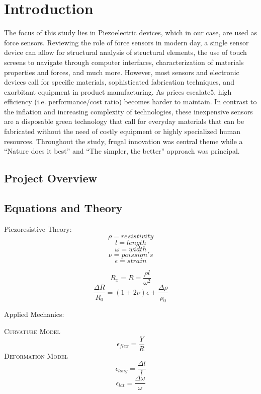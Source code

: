 \documentclass[12pt]{article}
\begin{document}
\pagebreak
\section{Introduction}
The focus of this study lies in Piezoelectric devices, which in our case, are used as force sensors. Reviewing the role of force sensors in modern day, a single sensor device can allow for structural analysis of structural elements, the use of touch screens to navigate through computer interfaces, characterization of materials properties and forces, and much more. However, most sensors and electronic devices call for specific materials, sophisticated fabrication techniques, and exorbitant equipment in product manufacturing. As prices escalate5, high efficiency (i.e. performance/cost ratio) becomes harder to maintain. In contrast to the inflation and increasing complexity of technologies, these inexpensive sensors are a disposable green technology that call for everyday materials that can be fabricated without the need of costly equipment or highly specialized human resources. Throughout the study, frugal innovation was central theme while a “Nature does it best” and “The simpler, the better” approach was principal.



\pagebreak



\subsection{Project Overview}

\subsection{Equations and Theory}

Piezoresistive Theory: \\

$$\rho=resistivity$$
$$\textit{l}=length$$
$$\omega=width$$
$$\nu=poission's$$
$$\epsilon=strain$$

$$R_x=R=\frac{\rho\textit{l}}{\omega^{2}}$$
$$\frac{\Delta R}{R_0}=(1+2\nu)\epsilon+\frac{\Delta \rho}{\rho_0}$$


Applied Mechanics: \\
\begin{center}
\textsc{Curvature Model}
$$\epsilon_{flex}=\frac{Y}{R}$$
\textsc{Deformation Model} 
$$\epsilon_{long}=\frac{\Delta\textit{l}}{\textit{l}}$$
$$\epsilon_{lat}=\frac{\Delta\omega}{\omega}$$
\end{center}
\end{document}
